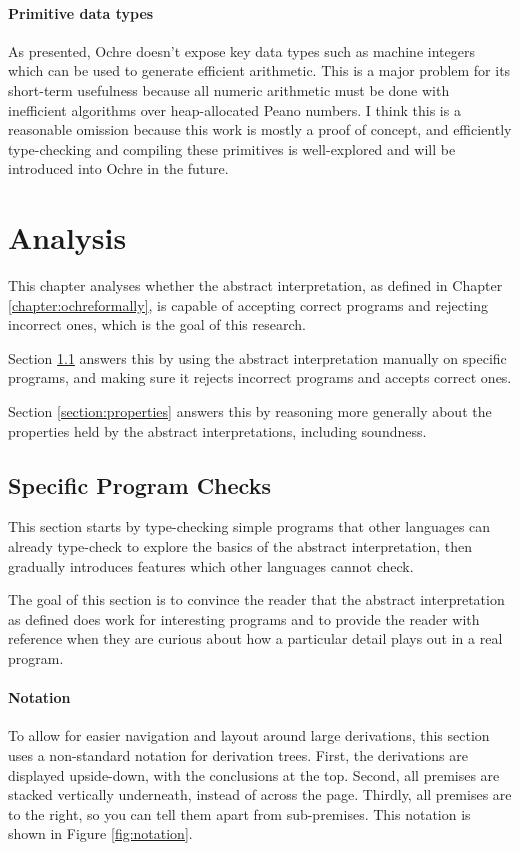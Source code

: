\documentclass[12pt,twoside]{report}
\begin{document}
\subsubsection{Primitive data types}
As presented, Ochre doesn't expose key data types such as machine integers which can be used to generate efficient arithmetic. This is a major problem for its short-term usefulness because all numeric arithmetic must be done with inefficient algorithms over heap-allocated Peano numbers. I think this is a reasonable omission because this work is mostly a proof of concept, and efficiently type-checking and compiling these primitives is well-explored and will be introduced into Ochre in the future.

\chapter{Analysis}
\label{chapter:analysis}
This chapter analyses whether the abstract interpretation, as defined in Chapter \ref{chapter:ochreformally}, is capable of accepting correct programs and rejecting incorrect ones, which is the goal of this research.

Section \ref{section:examplechecks} answers this by using the abstract interpretation manually on specific programs, and making sure it rejects incorrect programs and accepts correct ones.

Section \ref{section:properties} answers this by reasoning more generally about the properties held by the abstract interpretations, including soundness.

\section{Specific Program Checks}
\label{section:examplechecks}
This section starts by type-checking simple programs that other languages can already type-check to explore the basics of the abstract interpretation, then gradually introduces features which other languages cannot check.

The goal of this section is to convince the reader that the abstract interpretation as defined does work for interesting programs and to provide the reader with reference when they are curious about how a particular detail plays out in a real program.

\subsubsection{Notation}
To allow for easier navigation and layout around large derivations, this section uses a non-standard notation for derivation trees. First, the derivations are displayed upside-down, with the conclusions at the top. Second, all premises are stacked vertically underneath, instead of across the page. Thirdly, all premises are  to the right, so you can tell them apart from sub-premises. This notation is shown in Figure \ref{fig:notation}.
\end{document}
